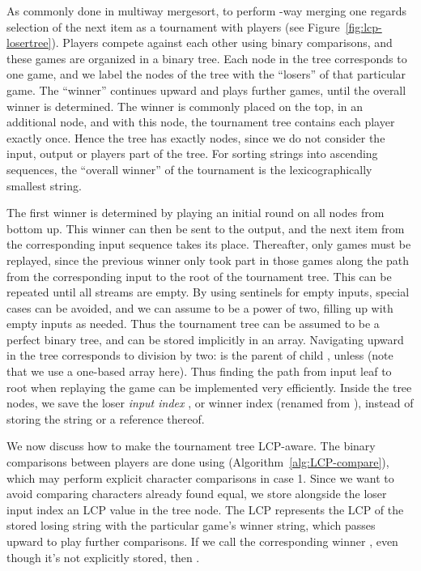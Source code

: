 \documentclass[a4paper]{myjournal}
\begin{document}
As commonly done in multiway mergesort, to perform -way merging one regards
selection of the next item as a tournament with  players (see
Figure~\ref{fig:lcp-losertree}). Players compete against each other using binary
comparisons, and these games are organized in a binary tree. Each node in the
tree corresponds to one game, and we label the nodes of the tree with the
``losers'' of that particular game. The ``winner'' continues upward and plays
further games, until the overall winner is determined. The winner is commonly
placed on the top, in an additional node, and with this node, the tournament
tree contains each player exactly once.  Hence the tree has exactly  nodes,
since we do not consider the input, output or players part of the tree.  For
sorting strings into ascending sequences, the ``overall winner'' of the
tournament is the lexicographically smallest string.

The first winner is determined by playing an initial round on all  nodes from
bottom up.  This winner can then be sent to the output, and the next item from
the corresponding input sequence takes its place.  Thereafter, only 
games must be replayed, since the previous winner only took part in those games
along the path from the corresponding input to the root of the tournament
tree. This can be repeated until all streams are empty. By using sentinels for
empty inputs, special cases can be avoided, and we can assume  to be a power
of two, filling up with empty inputs as needed. Thus the tournament tree can be
assumed to be a perfect binary tree, and can be stored implicitly in an
array. Navigating upward in the tree corresponds to division by two:  is the parent of child , unless  (note that we use a
one-based array here). Thus finding the path from input leaf to root when
replaying the game can be implemented very efficiently. Inside the tree nodes,
we save the loser \emph{input index} , or winner index  (renamed from
), instead of storing the string  or a reference thereof.

We now discuss how to make the tournament tree LCP-aware. The binary comparisons
between players are done using \LCPCompare (Algorithm~\ref{alg:LCP-compare}),
which may perform explicit character comparisons in case 1. Since we want to
avoid comparing characters already found equal, we store alongside the loser
input index  an LCP value  in the tree node. The LCP  represents
the LCP of the stored losing string  with the particular game's winner
string, which passes upward to play further comparisons. If we call the
corresponding winner , even though it's not explicitly stored, then .
\end{document}

